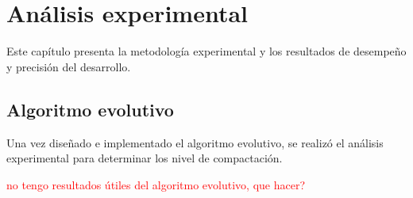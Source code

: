 \documentclass[a4paper,11pt]{book}
\newcommand{\red}[1]{\textcolor{red}{#1}}
\begin{document}
\chapter{Análisis experimental} \label{ch:ch5}

Este capítulo presenta la metodología experimental y los resultados de desempeño y precisión del desarrollo.

\section{Algoritmo evolutivo}
Una vez diseñado e implementado el algoritmo evolutivo, se realizó el análisis experimental para determinar los nivel de compactación.


\red{no tengo resultados útiles del algoritmo evolutivo, que hacer?}
\end{document}

